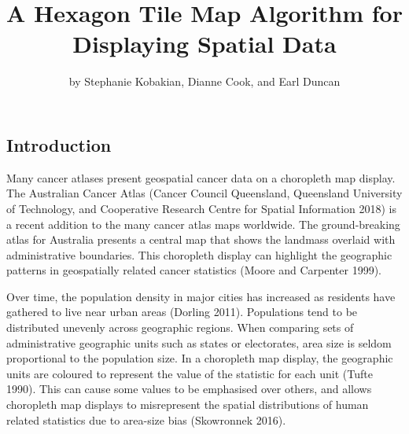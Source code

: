 \title{A Hexagon Tile Map Algorithm for Displaying Spatial Data}


\author{by Stephanie Kobakian, Dianne Cook, and Earl Duncan}

\maketitle


\hypertarget{introduction}{%
\subsection{Introduction}\label{introduction}}

Many cancer atlases present geospatial cancer data on a choropleth map display. The Australian Cancer Atlas (Cancer Council Queensland, Queensland University of Technology, and Cooperative Research Centre for Spatial Information 2018) is a recent addition to the many cancer atlas maps worldwide. The ground-breaking atlas for Australia presents a central map that shows the landmass overlaid with administrative boundaries. This choropleth display can highlight the geographic patterns in geospatially related cancer statistics (Moore and Carpenter 1999).

Over time, the population density in major cities has increased as residents have gathered to live near urban areas (Dorling 2011). Populations tend to be distributed unevenly across geographic regions. When comparing sets of administrative geographic units such as states or electorates, area size is seldom proportional to the population size. In a choropleth map display, the geographic units are coloured to represent the value of the statistic for each unit (Tufte 1990). This can cause some values to be emphasised over others, and allows choropleth map displays to misrepresent the spatial distributions of human related statistics due to area-size bias (Skowronnek 2016).

